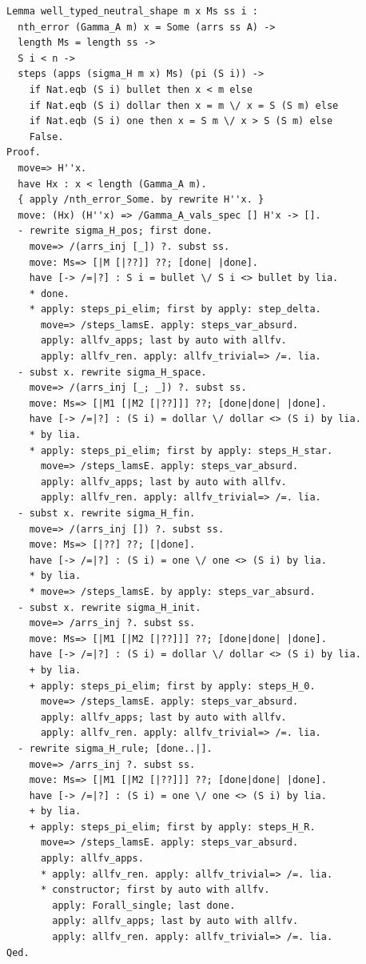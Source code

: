\begin{lstlisting}
Lemma well_typed_neutral_shape m x Ms ss i :
  nth_error (Gamma_A m) x = Some (arrs ss A) ->
  length Ms = length ss ->
  S i < n ->
  steps (apps (sigma_H m x) Ms) (pi (S i)) ->
    if Nat.eqb (S i) bullet then x < m else
    if Nat.eqb (S i) dollar then x = m \/ x = S (S m) else
    if Nat.eqb (S i) one then x = S m \/ x > S (S m) else
    False.
Proof.
  move=> H''x.
  have Hx : x < length (Gamma_A m).
  { apply /nth_error_Some. by rewrite H''x. }
  move: (Hx) (H''x) => /Gamma_A_vals_spec [] H'x -> [].
  - rewrite sigma_H_pos; first done.
    move=> /(arrs_inj [_]) ?. subst ss.
    move: Ms=> [|M [|??]] ??; [done| |done].
    have [-> /=|?] : S i = bullet \/ S i <> bullet by lia.
    * done.
    * apply: steps_pi_elim; first by apply: step_delta.
      move=> /steps_lamsE. apply: steps_var_absurd.
      apply: allfv_apps; last by auto with allfv.
      apply: allfv_ren. apply: allfv_trivial=> /=. lia.
  - subst x. rewrite sigma_H_space.
    move=> /(arrs_inj [_; _]) ?. subst ss.
    move: Ms=> [|M1 [|M2 [|??]]] ??; [done|done| |done].
    have [-> /=|?] : (S i) = dollar \/ dollar <> (S i) by lia.
    * by lia.
    * apply: steps_pi_elim; first by apply: steps_H_star.
      move=> /steps_lamsE. apply: steps_var_absurd.
      apply: allfv_apps; last by auto with allfv.
      apply: allfv_ren. apply: allfv_trivial=> /=. lia.
  - subst x. rewrite sigma_H_fin.
    move=> /(arrs_inj []) ?. subst ss.
    move: Ms=> [|??] ??; [|done].
    have [-> /=|?] : (S i) = one \/ one <> (S i) by lia.
    * by lia.
    * move=> /steps_lamsE. by apply: steps_var_absurd.
  - subst x. rewrite sigma_H_init.
    move=> /arrs_inj ?. subst ss.
    move: Ms=> [|M1 [|M2 [|??]]] ??; [done|done| |done].
    have [-> /=|?] : (S i) = dollar \/ dollar <> (S i) by lia.
    + by lia.
    + apply: steps_pi_elim; first by apply: steps_H_0.
      move=> /steps_lamsE. apply: steps_var_absurd.
      apply: allfv_apps; last by auto with allfv.
      apply: allfv_ren. apply: allfv_trivial=> /=. lia.
  - rewrite sigma_H_rule; [done..|].
    move=> /arrs_inj ?. subst ss.
    move: Ms=> [|M1 [|M2 [|??]]] ??; [done|done| |done].
    have [-> /=|?] : (S i) = one \/ one <> (S i) by lia.
    + by lia.
    + apply: steps_pi_elim; first by apply: steps_H_R.
      move=> /steps_lamsE. apply: steps_var_absurd.
      apply: allfv_apps.
      * apply: allfv_ren. apply: allfv_trivial=> /=. lia.
      * constructor; first by auto with allfv.
        apply: Forall_single; last done.
        apply: allfv_apps; last by auto with allfv.
        apply: allfv_ren. apply: allfv_trivial=> /=. lia.
Qed.


\end{lstlisting}
